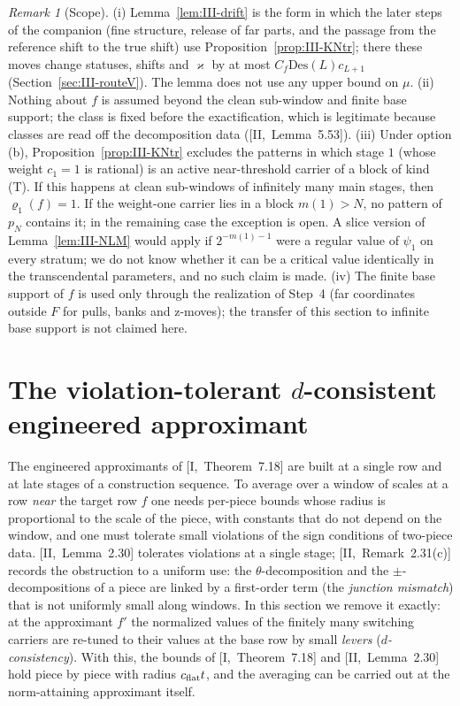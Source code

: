 \documentclass[10pt]{amsart}
\theoremstyle{definition}
\theoremstyle{remark}
\newtheorem{remark}[theorem]{Remark}
\begin{document}
\begin{remark}[Scope]\label{rem:III-KNscope}
(i) Lemma~\ref{lem:III-drift} is the form in which the later steps of the
companion (fine structure, release of far parts, and the passage from the
reference shift to the true shift) use Proposition~\ref{prop:III-KNtr}; there
these moves change statuses, shifts and $\varkappa$ by at most $C_f\mathrm{Des}(L)
c_{L+1}$ (Section~\ref{sec:III-routeV}).  The lemma does not use any upper
bound on $\mu$.
(ii) Nothing about $f$ is assumed beyond the clean sub-window and finite base
support; the class is fixed before the exactification, which is legitimate
because classes are read off the decomposition data ([II,~Lemma~5.53]).
(iii) Under option (b), Proposition~\ref{prop:III-KNtr} excludes the patterns
in which stage $1$ (whose weight $c_1=1$ is rational) is an active
near-threshold carrier of a block of kind (T).  If this happens at clean
sub-windows of infinitely many main stages, then $\varrho_1(f)=1$.  If the
weight-one carrier lies in a block $m(1)>N$, no pattern of $p_N$ contains
it; in the remaining case the exception is open.  A slice version of
Lemma~\ref{lem:III-NLM} would apply if $2^{-m(1)-1}$ were a regular value of
$\psi_1$ on every stratum; we do not know whether it can be a critical value
identically in the transcendental parameters, and no such claim is made.
(iv) The finite base support of $f$ is used only through the realization of
Step~4 (far coordinates outside $F$ for pulls, banks and z-moves); the
transfer of this section to infinite base support is not claimed here.
\end{remark}
\section{The violation-tolerant $d$-consistent engineered approximant}\label{sec:III-UE}

The engineered approximants of [I,~Theorem~7.18] are built at a single row and
at late stages of a construction sequence.  To average over a window of scales
at a row \emph{near} the target row $f$ one needs per-piece bounds whose radius
is proportional to the scale of the piece, with constants that do not depend on
the window, and one must tolerate small violations of the sign conditions of
two-piece data.  [II,~Lemma~2.30] tolerates violations at a single stage;
[II,~Remark~2.31(c)] records the obstruction to a uniform use: the
$\theta$-decomposition and the $\pm$-decompositions of a piece are linked by a
first-order term (the \emph{junction mismatch}) that is not uniformly small
along windows.  In this section we remove it exactly: at the approximant $f'$
the normalized values of the finitely many switching carriers are re-tuned to
their values at the base row by small \emph{levers}
(\emph{$d$-consistency}).  With this, the bounds of [I,~Theorem~7.18] and
[II,~Lemma~2.30] hold piece by piece with radius $c_{\rm flat}t$, and the
averaging can be carried out at the norm-attaining approximant itself.
\end{document}
